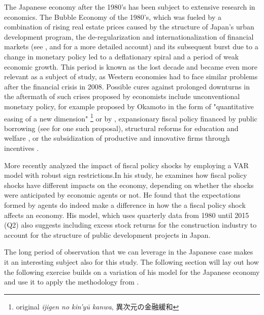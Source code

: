 \begin{CJK*}{UTF8}{min}
The Japanese economy after the 1980's has been subject to extensive research in economics. The Bubble Economy of the 1980's, which was fueled by a combination of rising real estate prices caused by the structure of Japan's urban development program, the de-regularization and internationalization of financial markets (see \citealt{oizumi1994}, and \citealt{allen2000} for a more detailed account) and its subsequent burst due to a change in monetary policy  led to a deflationary spiral and a period of weak economic growth. This period is known as the lost decade and became even more relevant as a subject of study, as Western economies had to face similar problems after the financial crisis in 2008. Possible cures against prolonged downturns in the aftermath of such crises proposed by economists include unconventional monetary policy, for example proposed by Okamoto in the form of "quantitative easing of a new dimension" \footnote{original \emph{ijigen no kin'y\={u} kanwa}, 異次元の金融緩和 } \citep{okamoto2013} or by \citet{hausman2014}, expansionary fiscal policy financed by public borrowing (see \citealt{koo2015} for one such proposal), structural reforms for education and welfare \citep{saxonhouse1998}, or the subsidization of productive and innovative firms through incentives \citep{hayashi20021990s}.

More recently \citet{morita2017} analyzed the impact of fiscal policy shocks by employing a VAR model with robust sign restrictions.In his study, he examines how fiscal policy shocks have different impacts on the economy, depending on whether the shocks were anticipated by economic agents or not. He found that the expectations formed by agents do indeed make a difference in how the a fiscal policy shock affects an economy. His model, which uses quarterly data from 1980 until 2015 (Q2) also suggests including excess stock returns for the construction industry to account for the structure of public development projects in Japan. 

The long period of observation that we can leverage in the Japanese case makes it an interesting subject also for this study. The following section will lay out how the following exercise builds on a variation of his model for the Japanese economy and use it to apply the methodology from \citeauthor{kapetanios2012}.

\end{CJK*}
